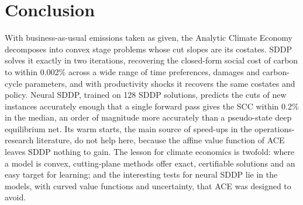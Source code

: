 \section{Conclusion}
\label{sec:conclusion}

With business-as-usual emissions taken as given, the Analytic Climate Economy decomposes into convex stage problems whose cut slopes are its costates. SDDP solves it exactly in two iterations, recovering the closed-form social cost of carbon to within 0.002\% across a wide range of time preferences, damages and carbon-cycle parameters, and with productivity shocks it recovers the same costates and policy. Neural SDDP, trained on 128 SDDP solutions, predicts the cuts of new instances accurately enough that a single forward pass gives the SCC within 0.2\% in the median, an order of magnitude more accurately than a pseudo-state deep equilibrium net. Its warm starts, the main source of speed-ups in the operations-research literature, do not help here, because the affine value function of ACE leaves SDDP nothing to gain. The lesson for climate economics is twofold: where a model is convex, cutting-plane methods offer exact, certifiable solutions and an easy target for learning; and the interesting tests for neural SDDP lie in the models, with curved value functions and uncertainty, that ACE was designed to avoid.
